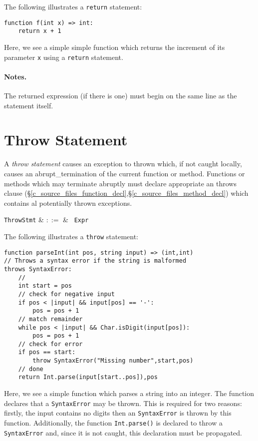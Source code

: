 \noindent The following illustrates a \lstinline{return} statement:

\begin{lstlisting}
function f(int x) => int:
    return x + 1
\end{lstlisting}

Here, we see a simple simple function which returns the increment of its parameter \lstinline{x} using a \lstinline{return} statement.


\paragraph{Notes.} The returned expression (if there is one) must begin on the same line as the statement itself.


\section{Throw Statement}
A {\em throw statement} causes an exception to thrown which, if not caught locally, causes an \gls{abrupt_termination} of the current function or method.  Functions or methods which may terminate abruptly must declare appropriate an throws clause (\S\ref{c_source_files_function_decl},\S\ref{c_source_files_method_decl}) which contains al potentially thrown exceptions.

\begin{syntax}
  \verb+ThrowStmt+ & $::=$ & \ \verb+Expr+\\
\end{syntax}

\noindent The following illustrates a \lstinline{throw} statement:

\begin{lstlisting}
function parseInt(int pos, string input) => (int,int)
// Throws a syntax error if the string is malformed
throws SyntaxError:
    //
    int start = pos
    // check for negative input
    if pos < |input| && input[pos] == '-':
        pos = pos + 1
    // match remainder
    while pos < |input| && Char.isDigit(input[pos]):
        pos = pos + 1
    // check for error
    if pos == start:
        throw SyntaxError("Missing number",start,pos)
    // done
    return Int.parse(input[start..pos]),pos
\end{lstlisting}
Here, we see a simple function which parses a string into an integer.  The function declares that a \lstinline{SyntaxError} may be thrown.  This is required for two reasons:  firstly, the input contains no digits then an \lstinline{SyntaxError} is thrown by this function.  Additionally, the function \lstinline{Int.parse()} is declared to throw a \lstinline{SyntaxError} and, since it is not caught, this declaration must be propagated.

